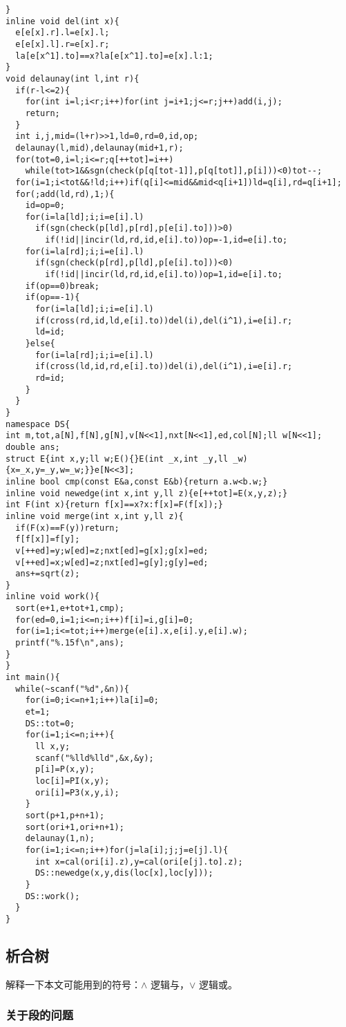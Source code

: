 \documentclass[12pt]{ctexart}
\begin{document}
\begin{lstlisting}
}
inline void del(int x){
  e[e[x].r].l=e[x].l;
  e[e[x].l].r=e[x].r;
  la[e[x^1].to]==x?la[e[x^1].to]=e[x].l:1;
}
void delaunay(int l,int r){
  if(r-l<=2){
    for(int i=l;i<r;i++)for(int j=i+1;j<=r;j++)add(i,j);
    return;
  }
  int i,j,mid=(l+r)>>1,ld=0,rd=0,id,op;
  delaunay(l,mid),delaunay(mid+1,r);
  for(tot=0,i=l;i<=r;q[++tot]=i++)
    while(tot>1&&sgn(check(p[q[tot-1]],p[q[tot]],p[i]))<0)tot--;
  for(i=1;i<tot&&!ld;i++)if(q[i]<=mid&&mid<q[i+1])ld=q[i],rd=q[i+1];
  for(;add(ld,rd),1;){
    id=op=0;
    for(i=la[ld];i;i=e[i].l)
      if(sgn(check(p[ld],p[rd],p[e[i].to]))>0)
        if(!id||incir(ld,rd,id,e[i].to))op=-1,id=e[i].to;
    for(i=la[rd];i;i=e[i].l)
      if(sgn(check(p[rd],p[ld],p[e[i].to]))<0)
        if(!id||incir(ld,rd,id,e[i].to))op=1,id=e[i].to;
    if(op==0)break;
    if(op==-1){
      for(i=la[ld];i;i=e[i].l)
      if(cross(rd,id,ld,e[i].to))del(i),del(i^1),i=e[i].r;
      ld=id;
    }else{
      for(i=la[rd];i;i=e[i].l)
      if(cross(ld,id,rd,e[i].to))del(i),del(i^1),i=e[i].r;
      rd=id;
    }
  }
}
namespace DS{
int m,tot,a[N],f[N],g[N],v[N<<1],nxt[N<<1],ed,col[N];ll w[N<<1];
double ans;
struct E{int x,y;ll w;E(){}E(int _x,int _y,ll _w){x=_x,y=_y,w=_w;}}e[N<<3];
inline bool cmp(const E&a,const E&b){return a.w<b.w;}
inline void newedge(int x,int y,ll z){e[++tot]=E(x,y,z);}
int F(int x){return f[x]==x?x:f[x]=F(f[x]);}
inline void merge(int x,int y,ll z){
  if(F(x)==F(y))return;
  f[f[x]]=f[y];
  v[++ed]=y;w[ed]=z;nxt[ed]=g[x];g[x]=ed;
  v[++ed]=x;w[ed]=z;nxt[ed]=g[y];g[y]=ed;
  ans+=sqrt(z);
}
inline void work(){
  sort(e+1,e+tot+1,cmp);
  for(ed=0,i=1;i<=n;i++)f[i]=i,g[i]=0;
  for(i=1;i<=tot;i++)merge(e[i].x,e[i].y,e[i].w);
  printf("%.15f\n",ans);
}
}
int main(){
  while(~scanf("%d",&n)){
    for(i=0;i<=n+1;i++)la[i]=0;
    et=1;
    DS::tot=0;
    for(i=1;i<=n;i++){
      ll x,y;
      scanf("%lld%lld",&x,&y);
      p[i]=P(x,y);
      loc[i]=PI(x,y);
      ori[i]=P3(x,y,i);
    }
    sort(p+1,p+n+1);
    sort(ori+1,ori+n+1);
    delaunay(1,n);
    for(i=1;i<=n;i++)for(j=la[i];j;j=e[j].l){
      int x=cal(ori[i].z),y=cal(ori[e[j].to].z);
      DS::newedge(x,y,dis(loc[x],loc[y]));
    }
    DS::work();
  }
}
\end{lstlisting}

\subsection{析合树}

解释一下本文可能用到的符号：$\wedge$ 逻辑与，$\vee$ 逻辑或。

\subsubsection{关于段的问题}
\end{document}
